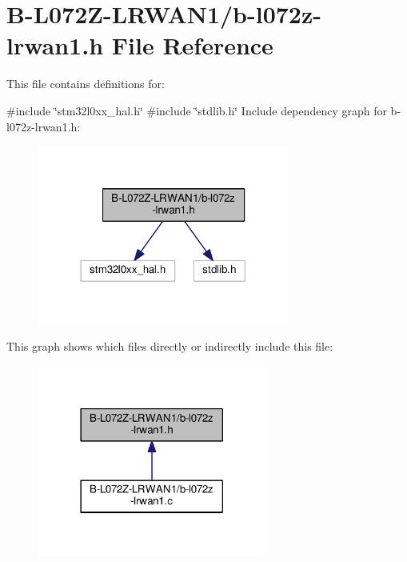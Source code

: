 \hypertarget{b-l072z-lrwan1_8h}{}\section{B-\/\+L072\+Z-\/\+L\+R\+W\+A\+N1/b-\/l072z-\/lrwan1.h File Reference}
\label{b-l072z-lrwan1_8h}


This file contains definitions for\+:  


{\ttfamily \#include \char`\"{}stm32l0xx\+\_\+hal.\+h\char`\"{}}\newline
{\ttfamily \#include \char`\"{}stdlib.\+h\char`\"{}}\newline
Include dependency graph for b-\/l072z-\/lrwan1.h\+:
\nopagebreak
\begin{figure}[H]
\begin{center}
\leavevmode
\includegraphics[width=234pt]{b-l072z-lrwan1_8h__incl}
\end{center}
\end{figure}
This graph shows which files directly or indirectly include this file\+:
\nopagebreak
\begin{figure}[H]
\begin{center}
\leavevmode
\includegraphics[width=213pt]{b-l072z-lrwan1_8h__dep__incl}
\end{center}
\end{figure}
